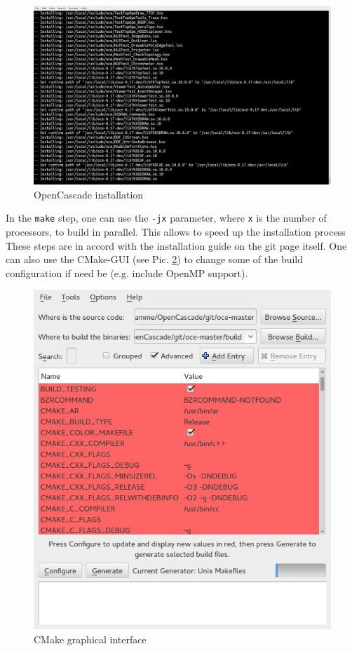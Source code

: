 \documentclass[11pt,a4paper,article,bibtotoc,idxtotoc,headsepline,footsepline,footexclude,DIV13,oneside]{scrbook}
\begin{document}
\begin{figure}
\centering
\includegraphics[scale=0.3]{img/OC_Install2.png}
\caption{OpenCascade installation}
\label{fig:OC_install}
\end{figure}
	In the \texttt{make} step, one can use the \texttt{-jx} parameter, where \texttt{x} is the number of processors, to build in parallel. This allows to speed up the installation process These steps are in accord with the installation guide on the git page itself. One can also use the CMake-GUI (see Pic. \ref{fig:CMake_GUI}) to change some of the build configuration if need be (e.g. include OpenMP support).
	
\begin{figure}
\centering
\includegraphics[scale=0.5]{img/CMake_GUI.png}
\caption{CMake graphical interface}
\label{fig:CMake_GUI}
\end{figure}
\end{document}
